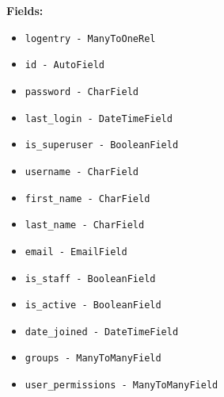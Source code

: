 \documentclass[oneside,openany,obeyspaces]{book}
\begin{document}
\begin{flushleft}
    \textbf{Fields:}
    \begin{itemize}
        \item \texttt{logentry - ManyToOneRel}
        \item \texttt{id - AutoField}
        \item \texttt{password - CharField}
        \item \texttt{last\_login - DateTimeField}
        \item \texttt{is\_superuser - BooleanField}
        \item \texttt{username - CharField}
        \item \texttt{first\_name - CharField}
        \item \texttt{last\_name - CharField}
        \item \texttt{email - EmailField}
        \item \texttt{is\_staff - BooleanField}
        \item \texttt{is\_active - BooleanField}
        \item \texttt{date\_joined - DateTimeField}
        \item \texttt{groups - ManyToManyField}
        \item \texttt{user\_permissions - ManyToManyField}
    \end{itemize}


\end{flushleft}
\end{document}
